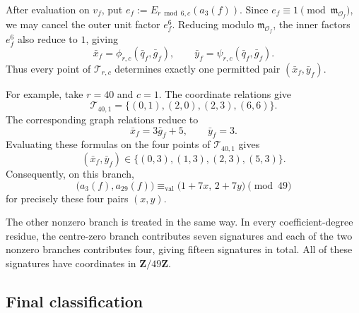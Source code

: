 \documentclass[11pt]{article}
\theoremstyle{plain}
\theoremstyle{definition}
\theoremstyle{remark}
\numberwithin{equation}{section}
\begin{document}
After evaluation on \(v_f\), put \(e_f:=E_{r\bmod6,c}(a_3(f))\). Since \(e_f\equiv1\pmod{\mathfrak m_{\mathcal O_f}}\), we may cancel the outer unit factor \(e_f^6\). Reducing modulo \(\mathfrak m_{\mathcal O_f}\), the inner factors \(e_f^6\) also reduce to \(1\), giving \[ \bar x_f=\phi_{r,c}(\bar q_f,\bar g_f), \qquad \bar y_f=\psi_{r,c}(\bar q_f,\bar g_f). \] Thus every point of \(\mathcal T_{r,c}\) determines exactly one permitted pair \((\bar x_f,\bar y_f)\). 

For example, take \(r=40\) and \(c=1\). The coordinate relations give \[ \mathcal T_{40,1} = \{(0,1),(2,0),(2,3),(6,6)\}. \] The corresponding graph relations reduce to \[ \bar x_f=3\bar g_f+5, \qquad \bar y_f=3. \] Evaluating these formulas on the four points of \(\mathcal T_{40,1}\) gives \[(\bar x_f,\bar y_f) \in \{(0,3),(1,3),(2,3),(5,3)\}. \] Consequently, on this branch, \[ \bigl(a_3(f),a_{29}(f)\bigr) \equiv_{\mathrm{val}} \bigl(1+7x,\,2+7y\bigr) \pmod{49} \] for precisely these four pairs \((x,y)\).

The other nonzero branch is treated in the same way. In every coefficient-degree residue, the centre-zero branch contributes seven signatures and each of the two nonzero branches contributes four, giving fifteen signatures in total. All of these signatures have coordinates in \(\mathbf Z/49\mathbf Z\).

\subsection{Final classification}
\end{document}
